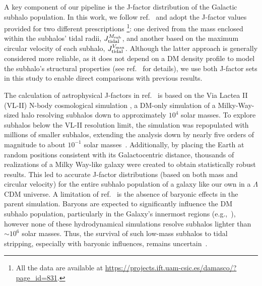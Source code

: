 \documentclass[12pt, a4paper]{article}
\newcommand{\red}[1]{\textcolor{red}{#1}}
\newcommand{\dima}[1]{\textcolor{purple}{{Dima: #1}}}
\newcommand{\masc}[1]{\textcolor{ForestGreen}{{MASC: #1}}}
\newcommand{\Msub}{M_{\rm sub}}
\newcommand{\Vmax}{V_{\rm max}}
\begin{document}
A key component of our pipeline is the J-factor distribution of the Galactic subhalo population. In this work, we follow ref.~\cite{2024MNRAS.530.2496A} and adopt the J-factor values provided for two different prescriptions%
\footnote{All the data are available at \url{https://projects.ift.uam-csic.es/damasco/?page_id=831}.}: one derived from the mass enclosed within the subhalos' tidal radii, $J_{\rm tidal}^{\Msub}$, and another based on the maximum circular velocity of each subhalo, $J_{\rm tidal}^{\Vmax}$. Although the latter approach is generally considered more reliable, as it does not depend on a DM density profile to model the subhalo's structural properties (see ref.~\cite{2024MNRAS.530.2496A} for details), we use both J-factor sets in this study to enable direct comparisons with previous results.

The calculation of astrophysical J-factors in ref.~\cite{2024MNRAS.530.2496A} is based on the Via Lactea II (VL-II) N-body cosmological simulation \cite{2007ApJ...667..859D}, a DM-only simulation of a Milky-Way-sized halo resolving subhalos down to approximately $10^4$ solar masses. 
To explore subhalos below the VL-II resolution limit, 
the simulation was repopulated with millions of smaller subhalos, extending the analysis down by nearly five orders of magnitude 
to about $10^{-1}$ solar masses~\cite{2022PhRvD.105h3006C}.
Additionally, by placing the Earth at random positions consistent with its Galactocentric distance, 
thousands of realizations of a Milky Way-like galaxy were created to obtain statistically robust results. 
This led to accurate J-factor distributions (based on both mass and circular velocity) for the entire subhalo population of a galaxy like our own in a $\Lambda$CDM universe. A limitation of ref.~\cite{2024MNRAS.530.2496A} is the absence of baryonic effects in the parent simulation. Baryons are expected to significantly influence the DM subhalo population, particularly in the Galaxy's innermost regions (e.g.,~\cite{2019MNRAS.487.4409K,2017MNRAS.471.1709G,2021MNRAS.501.3558G}), however none of these hydrodynamical simulations resolve subhalos lighter than $\sim 10^6$ solar masses. Thus, the survival of such low-mass subhalos to tidal stripping, especially with baryonic influences, remains uncertain~\cite{2018MNRAS.474.3043V,2020MNRAS.491.4591E,2023MNRAS.518...93A}.
\end{document}
